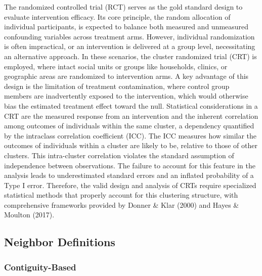 \documentclass{article}[11pt]
\begin{document}
The randomized controlled trial (RCT) serves as the gold standard design to evaluate intervention efficacy\cite{kim_handbook_2021}. Its core principle, the random allocation of individual participants, is expected to balance both measured and unmeasured confounding variables across treatment arms\cite{matthews_introduction_2006}. However, individual randomization is often impractical, or an intervention is delivered at a group level, necessitating an alternative approach\cite{donner_design_2000}\cite{hayes_cluster_2017}. In these scenarios, the cluster randomized trial (CRT) is employed, where intact social units or groups like households, clinics, or geographic areas are randomized to intervention arms\cite{donner_design_2000}\cite{murray_design_1998}. A key advantage of this design is the limitation of treatment contamination, where control group members are inadvertently exposed to the intervention, which would otherwise bias the estimated treatment effect toward the null\cite{hayes_cluster_2017}. Statistical considerations in a CRT are the measured response from an intervention and the inherent correlation among outcomes of individuals within the same cluster, a dependency quantified by the intraclass correlation coefficient (ICC)\cite{donner_design_2000}\cite{hemming_how_2017}. The ICC measures how similar the outcomes of individuals within a cluster are likely to be, relative to those of other clusters. This intra-cluster correlation violates the standard assumption of independence between observations. The failure to account for this feature in the analysis leads to underestimated standard errors and an inflated probability of a Type I error\cite{campbell_how_2014}\cite{ntani_consequences_2021}. Therefore, the valid design and analysis of CRTs require specialized statistical methods that properly account for this clustering structure, with comprehensive frameworks provided by Donner \& Klar (2000)\cite{donner_design_2000} and Hayes \& Moulton (2017)\cite{hayes_cluster_2017}.

\subsection{Neighbor Definitions}

\subsubsection{Contiguity-Based}
\end{document}
